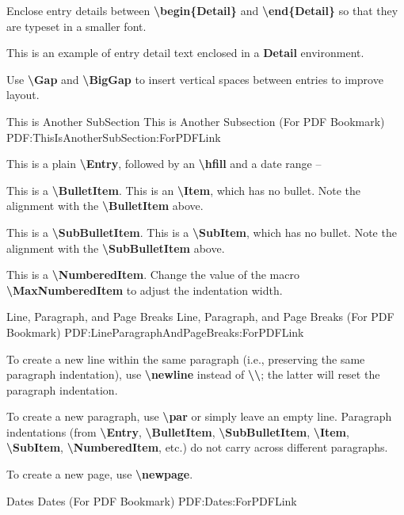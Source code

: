 \documentclass[letterpaper,MMMMyyyy,nonstopmode]{simpleresumecv}
\newcommand{\Code}[1]{\mbox{\textbf{#1}}}
\newcommand{\CodeCommand}[1]{\mbox{\textbf{\textbackslash{#1}}}}
\begin{document}
\begin{Body}
\Gap
\BulletItem
Enclose entry details between
\CodeCommand{begin\{Detail\}} and
\CodeCommand{end\{Detail\}}
so that they are typeset in a smaller font.
\begin{Detail}
\Item
This is an example of entry detail text enclosed in a \Code{Detail} environment.
\end{Detail}

\Gap
\BulletItem
Use \CodeCommand{Gap} and \CodeCommand{BigGap} to insert vertical spaces between entries to improve layout.

\BigGap
\SubSection
{This is Another SubSection}
{This is Another Subsection (For PDF Bookmark)}
{PDF:ThisIsAnotherSubSection:ForPDFLink}

\Gap
\Entry
This is a plain \CodeCommand{Entry},
followed by an \CodeCommand{hfill} and a date range
\hfill
{} --

\Gap
\BulletItem
This is a \CodeCommand{BulletItem}.
\Item
This is an \CodeCommand{Item}, which has no bullet.
Note the alignment with the \CodeCommand{BulletItem} above.

\Gap
\SubBulletItem
This is a \CodeCommand{SubBulletItem}.
\SubItem
This is a \CodeCommand{SubItem}, which has no bullet.
Note the alignment with the \CodeCommand{SubBulletItem} above.

\Gap
\NumberedItem{[42]}
This is a \CodeCommand{NumberedItem}.
Change the value of the macro \CodeCommand{MaxNumberedItem} to adjust the indentation width.

\BigGap
\SubSection
{Line, Paragraph, and Page Breaks}
{Line, Paragraph, and Page Breaks (For PDF Bookmark)}
{PDF:LineParagraphAndPageBreaks:ForPDFLink}

\Gap
\BulletItem
To create a new line within the same paragraph (i.e., preserving the same paragraph indentation), use \CodeCommand{newline} instead of \CodeCommand{\textbackslash};
the latter will reset the paragraph indentation.

\Gap
\BulletItem
To create a new paragraph, use \CodeCommand{par} or simply leave an empty line.
Paragraph indentations (from
\CodeCommand{Entry},
\CodeCommand{BulletItem},
\CodeCommand{SubBulletItem},
\CodeCommand{Item},
\CodeCommand{SubItem},
\CodeCommand{NumberedItem},
etc.) do not carry across different paragraphs.

\Gap
\BulletItem
To create a new page, use \CodeCommand{newpage}.

\BigGap
\SubSection
{Dates}
{Dates (For PDF Bookmark)}
{PDF:Dates:ForPDFLink}


\end{Body}
\end{document}
